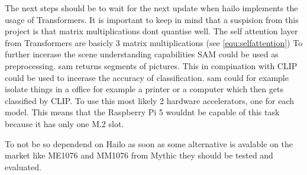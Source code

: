 The next steps should be to wait for the next update when hailo implements the usage of Transformers.
It is important to keep in mind that a suspision from this project is that matrix multiplications dont quantise well.
The self attention layer from Transformers are basicly 3 matrix multiplications (see \cref{equ:selfattention})
To further incerase the scene understanding capabilities SAM\cite{sam} could be used as preprocessing.
\acrshort{sam} returns segments of pictures.
This in compination with CLIP could be used to incerase the accuracy of classification.
\acrshort{sam} could for example isolate things in a office for example a printer or a computer which then gets classified by CLIP.
To use this most likely 2 hardware accelerators, one for each model.
This means that the Raspberry Pi 5 wouldnt be capable of this task because it has only one M.2 slot.

To not be so dependend on Hailo as soon as some alternative is avalable on the market like ME1076 and MM1076 from Mythic they should be tested and evaluated.

